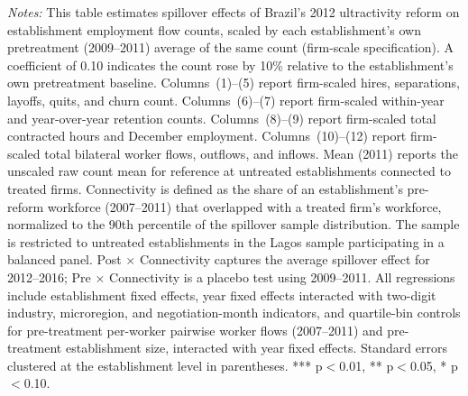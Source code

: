 \documentclass[12pt,letterpaper]{article}
\begin{document}
\begin{table}[]
\begin{threeparttable}
\begin{tablenotes}
\item \textit{Notes:} This table estimates spillover effects of Brazil's 2012 ultractivity reform on establishment employment flow counts, scaled by each establishment's own pretreatment (2009--2011) average of the same count (firm-scale specification). A coefficient of 0.10 indicates the count rose by 10\% relative to the establishment's own pretreatment baseline. Columns~(1)--(5) report firm-scaled hires, separations, layoffs, quits, and churn count. Columns~(6)--(7) report firm-scaled within-year and year-over-year retention counts. Columns~(8)--(9) report firm-scaled total contracted hours and December employment. Columns~(10)--(12) report firm-scaled total bilateral worker flows, outflows, and inflows. Mean (2011) reports the unscaled raw count mean for reference at untreated establishments connected to treated firms. Connectivity is defined as the share of an establishment's pre-reform workforce (2007--2011) that overlapped with a treated firm's workforce, normalized to the 90th percentile of the spillover sample distribution. The sample is restricted to untreated establishments in the Lagos sample participating in a balanced panel. Post $\times$ Connectivity captures the average spillover effect for 2012--2016; Pre $\times$ Connectivity is a placebo test using 2009--2011. All regressions include establishment fixed effects, year fixed effects interacted with two-digit industry, microregion, and negotiation-month indicators, and quartile-bin controls for pre-treatment per-worker pairwise worker flows (2007--2011) and pre-treatment establishment size, interacted with year fixed effects. Standard errors clustered at the establishment level in parentheses. *** p$<$0.01, ** p$<$0.05, * p$<$0.10.
\end{tablenotes}
\end{threeparttable}
\end{table}

\clearpage
\end{document}
